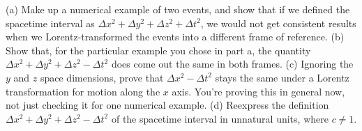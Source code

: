 (a) Make up a numerical example of two events, and show that if we defined the
spacetime interval as
$\Delta x^2+\Delta y^2+\Delta z^2+\Delta t^2$, we would
not get consistent results when we Lorentz-transformed the events into
a different frame of reference.\hwendpart
(b) Show that, for the particular example you chose in part
a, the quantity $\Delta x^2+\Delta y^2+\Delta z^2-\Delta t^2$
does come out the same in both frames.\hwendpart
(c) Ignoring the $y$ and $z$ space dimensions,
prove that $\Delta x^2-\Delta t^2$ stays the same under
a Lorentz transformation for motion along the $x$ axis.
You're proving this in general now, not just checking it
for one numerical example.\hwendpart
(d) Reexpress the definition
$\Delta x^2+\Delta y^2+\Delta z^2-\Delta t^2$ of the
spacetime interval in unnatural units, where $c\ne1$.

